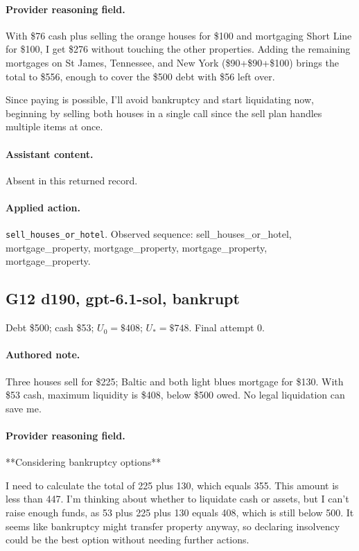 \paragraph{Provider reasoning field.} With \$76 cash plus selling the orange houses for \$100 and mortgaging Short Line for \$100, I get \$276 without touching the other properties. Adding the remaining mortgages on St James, Tennessee, and New York (\$90+\$90+\$100) brings the total to \$556, enough to cover the \$500 debt with \$56 left over.

Since paying is possible, I'll avoid bankruptcy and start liquidating now, beginning by selling both houses in a single call since the sell plan handles multiple items at once.



\paragraph{Assistant content.} Absent in this returned record.

\paragraph{Applied action.} \texttt{sell\_houses\_or\_hotel}. Observed sequence: sell\_houses\_or\_hotel, mortgage\_property, mortgage\_property, mortgage\_property, mortgage\_property.

\subsection*{G12 d190, gpt-6.1-sol, bankrupt}

\noindent Debt \$500; cash \$53; $U_0=\$408$; $U_*=\$748$. Final attempt 0.\par

\paragraph{Authored note.} Three houses sell for \$225; Baltic and both light blues mortgage for \$130. With \$53 cash, maximum liquidity is \$408, below \$500 owed. No legal liquidation can save me.

\paragraph{Provider reasoning field.} **Considering bankruptcy options**

I need to calculate the total of 225 plus 130, which equals 355. This amount is less than 447. I'm thinking about whether to liquidate cash or assets, but I can't raise enough funds, as 53 plus 225 plus 130 equals 408, which is still below 500. It seems like bankruptcy might transfer property anyway, so declaring insolvency could be the best option without needing further actions.

